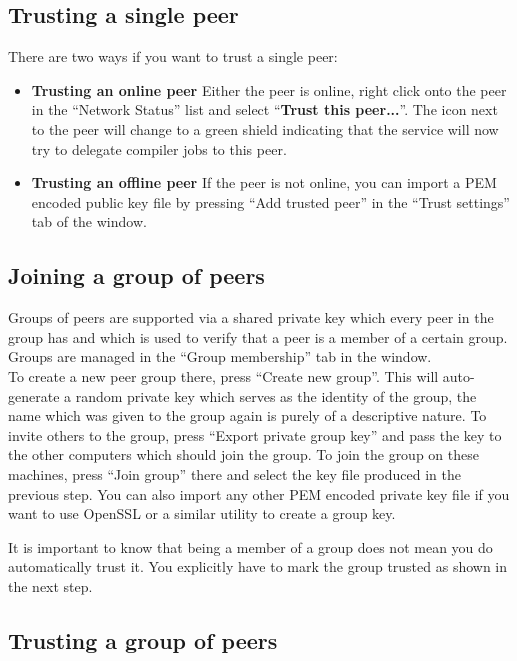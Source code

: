 \documentclass[a4paper,9pt]{scrartcl}
\begin{document}
\subsection{Trusting a single peer}
There are two ways if you want to trust a single peer:
\begin{itemize}
  \item{\bf Trusting an online peer} Either the peer is online, right click onto the peer in the ``Network Status'' list and select ``\textbf{Trust this peer...}''. The icon next to the peer will change to a green shield indicating that the service will now try to delegate compiler jobs to this peer.
  \item{\bf Trusting an offline peer} If the peer is not online, you can import a PEM encoded public key file by pressing ``Add trusted peer'' in the ``Trust settings'' tab of the window.
\end{itemize}


\subsection{Joining a group of peers}

Groups of peers are supported via a shared private key which every peer in the group has and which is used to verify that a peer is a member of a certain group. \\
Groups are managed in the ``Group membership'' tab in the window. \\
To create a new peer group there, press ``Create new group''. This will auto-generate a random private key which serves as the identity of the group, the name which was given to the group again is purely of a descriptive nature. To invite others to the group, press ``Export private group key'' and pass the key to the other computers which should join the group. To join the group on these machines, press ``Join group'' there and select the key file produced in the previous step. You can also import any other PEM encoded private key file if you want to use OpenSSL or a similar utility to create a group key.\\
\smallskip

It is important to know that being a member of a group does not mean you do automatically trust it. You explicitly have to mark the group trusted as shown in the next step.

\subsection{Trusting a group of peers}
\end{document}
